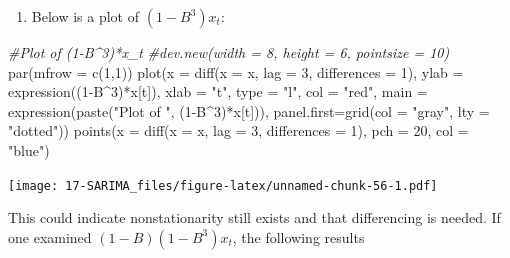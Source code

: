 \documentclass[
]{book}
\newenvironment{Shaded}{\begin{snugshade}}{\end{snugshade}}
\newcommand{\AttributeTok}[1]{\textcolor[rgb]{0.77,0.63,0.00}{#1}}
\newcommand{\CommentTok}[1]{\textcolor[rgb]{0.56,0.35,0.01}{\textit{#1}}}
\newcommand{\DecValTok}[1]{\textcolor[rgb]{0.00,0.00,0.81}{#1}}
\newcommand{\FunctionTok}[1]{\textcolor[rgb]{0.00,0.00,0.00}{#1}}
\newcommand{\NormalTok}[1]{#1}
\newcommand{\SpecialCharTok}[1]{\textcolor[rgb]{0.00,0.00,0.00}{#1}}
\newcommand{\StringTok}[1]{\textcolor[rgb]{0.31,0.60,0.02}{#1}}
\providecommand{\tightlist}{%
  \setlength{\itemsep}{0pt}\setlength{\parskip}{0pt}}
\theoremstyle{definition}
\theoremstyle{definition}
\theoremstyle{definition}
\theoremstyle{definition}
\theoremstyle{remark}
\begin{document}
\begin{enumerate}
\def\labelenumi{\arabic{enumi}.}
\setcounter{enumi}{3}
\tightlist
\item
  Below is a plot of \((1-B^3)x_t\):
\end{enumerate}

\begin{Shaded}
\begin{Highlighting}[]
 \CommentTok{\#Plot of (1{-}B\^{}3)*x\_t }
  \CommentTok{\#dev.new(width = 8, height = 6, pointsize = 10)}
  \FunctionTok{par}\NormalTok{(}\AttributeTok{mfrow =} \FunctionTok{c}\NormalTok{(}\DecValTok{1}\NormalTok{,}\DecValTok{1}\NormalTok{))}
  \FunctionTok{plot}\NormalTok{(}\AttributeTok{x =} \FunctionTok{diff}\NormalTok{(}\AttributeTok{x =}\NormalTok{ x, }\AttributeTok{lag =} \DecValTok{3}\NormalTok{, }\AttributeTok{differences =} \DecValTok{1}\NormalTok{), }\AttributeTok{ylab =} \FunctionTok{expression}\NormalTok{((}\DecValTok{1}\SpecialCharTok{{-}}\NormalTok{B}\SpecialCharTok{\^{}}\DecValTok{3}\NormalTok{)}\SpecialCharTok{*}\NormalTok{x[t]), }\AttributeTok{xlab =} \StringTok{"t"}\NormalTok{, }\AttributeTok{type =} \StringTok{"l"}\NormalTok{, }\AttributeTok{col =} \StringTok{"red"}\NormalTok{,  }
        \AttributeTok{main =}  \FunctionTok{expression}\NormalTok{(}\FunctionTok{paste}\NormalTok{(}\StringTok{"Plot of "}\NormalTok{, (}\DecValTok{1}\SpecialCharTok{{-}}\NormalTok{B}\SpecialCharTok{\^{}}\DecValTok{3}\NormalTok{)}\SpecialCharTok{*}\NormalTok{x[t])), }\AttributeTok{panel.first=}\FunctionTok{grid}\NormalTok{(}\AttributeTok{col =} \StringTok{"gray"}\NormalTok{, }\AttributeTok{lty =} \StringTok{"dotted"}\NormalTok{))}
  \FunctionTok{points}\NormalTok{(}\AttributeTok{x =} \FunctionTok{diff}\NormalTok{(}\AttributeTok{x =}\NormalTok{ x, }\AttributeTok{lag =} \DecValTok{3}\NormalTok{, }\AttributeTok{differences =} \DecValTok{1}\NormalTok{), }\AttributeTok{pch =} \DecValTok{20}\NormalTok{, }\AttributeTok{col =} \StringTok{"blue"}\NormalTok{)}
\end{Highlighting}
\end{Shaded}

\texttt{[image: 17-SARIMA\_files/figure-latex/unnamed-chunk-56-1.pdf]}

This could indicate nonstationarity still exists and that differencing is needed. If one examined \((1-B)(1-B^3)x_t\), the following results
\end{document}
